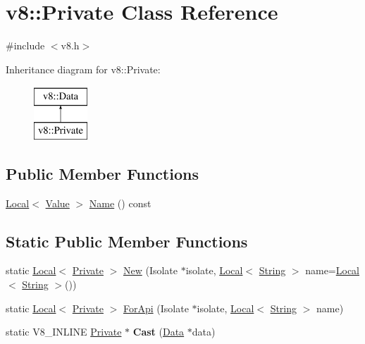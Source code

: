 \hypertarget{classv8_1_1Private}{}\section{v8\+:\+:Private Class Reference}
\label{classv8_1_1Private}


{\ttfamily \#include $<$v8.\+h$>$}

Inheritance diagram for v8\+:\+:Private\+:\begin{figure}[H]
\begin{center}
\leavevmode
\includegraphics[height=2.000000cm]{classv8_1_1Private}
\end{center}
\end{figure}
\subsection*{Public Member Functions}
\begin{DoxyCompactItemize}
\item 
\mbox{\hyperlink{classv8_1_1Local}{Local}}$<$ \mbox{\hyperlink{classv8_1_1Value}{Value}} $>$ \mbox{\hyperlink{classv8_1_1Private_a96d9a8cd33493038a95169ca28575327}{Name}} () const
\end{DoxyCompactItemize}
\subsection*{Static Public Member Functions}
\begin{DoxyCompactItemize}
\item 
static \mbox{\hyperlink{classv8_1_1Local}{Local}}$<$ \mbox{\hyperlink{classv8_1_1Private}{Private}} $>$ \mbox{\hyperlink{classv8_1_1Private_ac23e6937de502a4aa3e239e67c6c3c2e}{New}} (Isolate $\ast$isolate, \mbox{\hyperlink{classv8_1_1Local}{Local}}$<$ \mbox{\hyperlink{classv8_1_1String}{String}} $>$ name=\mbox{\hyperlink{classv8_1_1Local}{Local}}$<$ \mbox{\hyperlink{classv8_1_1String}{String}} $>$())
\item 
static \mbox{\hyperlink{classv8_1_1Local}{Local}}$<$ \mbox{\hyperlink{classv8_1_1Private}{Private}} $>$ \mbox{\hyperlink{classv8_1_1Private_a1a6d7c68b6761bd4b8134e4a46dbf263}{For\+Api}} (Isolate $\ast$isolate, \mbox{\hyperlink{classv8_1_1Local}{Local}}$<$ \mbox{\hyperlink{classv8_1_1String}{String}} $>$ name)
\item 
\mbox{\label{classv8_1_1Private_a3df565232e66989a2c8a9e708a1e2d86}} 
static V8\+\_\+\+I\+N\+L\+I\+NE \mbox{\hyperlink{classv8_1_1Private}{Private}} $\ast$ {\bfseries Cast} (\mbox{\hyperlink{classv8_1_1Data}{Data}} $\ast$data)
\end{DoxyCompactItemize}


